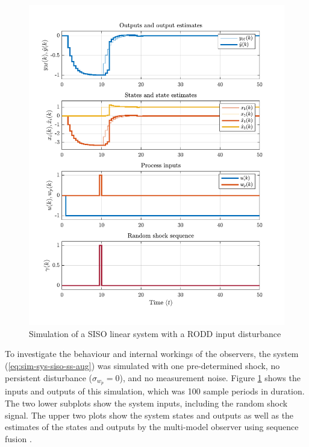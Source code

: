 \begin{figure}[htp]
	\centering
	\includegraphics[width=13cm]{images/rod_MKF_SF_test_sim_MKF_SF95_ioplot.pdf}
	\caption{Simulation of a SISO linear system with a RODD input disturbance}
	\label{fig:rod-obs-sim-test-ioplot-SF95}
\end{figure}
To investigate the behaviour and internal workings of the observers, the system (\ref{eq:sim-sys-siso-ss-aug}) was simulated with one pre-determined shock, no persistent disturbance ($\sigma_{w_p}=0$), and no measurement noise. Figure \ref{fig:rod-obs-sim-test-ioplot-SF95} shows the inputs and outputs of this simulation, which was 100 sample periods in duration. The two lower subplots show the system inputs, including the random shock signal. The upper two plots show the system states and outputs as well as the estimates of the states and outputs by the multi-model observer using sequence fusion \citep{robertson_detection_1995}.

